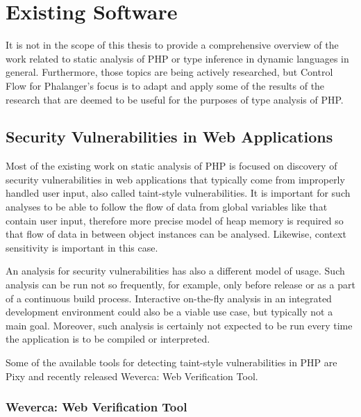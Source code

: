 \chapter{Existing Software}

    It is not in the scope of this thesis to provide a comprehensive 
    overview of the work related to static analysis of PHP or type 
    inference in dynamic languages in general. Furthermore, those 
    topics are being actively researched, but Control Flow for 
    Phalanger's focus is to adapt and apply some of the results 
    of the research that are deemed to be useful for the 
    purposes of type analysis of PHP.

    \section{Security Vulnerabilities in Web Applications}
    
    Most of the existing work on static analysis of PHP is 
    focused on discovery of security vulnerabilities in 
    web applications that typically come from improperly 
    handled user input, also called taint-style vulnerabilities. 
    It is important for such analyses to be able to follow 
    the flow of data from global variables like  
    that contain user input, therefore more precise model of 
    heap memory is required so that flow of data in between 
    object instances can be analysed. Likewise, 
    context sensitivity is important in this case.
    
    An analysis for security vulnerabilities has also a different 
    model of usage. Such analysis can be run not so frequently, 
    for example, only before release or as a part of a continuous 
    build process. Interactive on-the-fly analysis in an 
    integrated development environment could also be a viable 
    use case, but typically not a main goal. Moreover, such analysis 
    is certainly not expected to be run every time the 
    application is to be compiled or interpreted.
    
    Some of the available tools for detecting taint-style 
    vulnerabilities in PHP are Pixy\cite{jovanovic2006pixy} and recently released 
    Weverca: Web Verification Tool\cite{hauzarhunting}.    
    
    \subsection{Weverca: Web Verification Tool}

